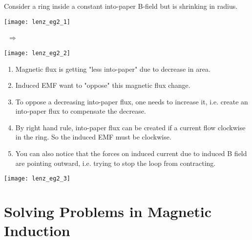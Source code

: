 \documentclass[class=article, crop=false, 12pt]{standalone}
\begin{document}
\begin{example}
    Consider a ring inside a constant into-paper B-field
    but is shrinking in radius.
    \begin{center}
        \begin{minipage}{0.3\linewidth}
            \centering
            \texttt{[image: lenz\_eg2\_1]}
            \phantom{A}
        \end{minipage}
        {\huge \ $\Rightarrow$\ }
        \begin{minipage}{0.3\linewidth}
            \centering
            \texttt{[image: lenz\_eg2\_2]}
        \end{minipage}
    \end{center}

    \begin{enumerate}
        \item Magnetic flux is getting "less into-paper" due to
        decrease in area.
        \item Induced EMF want to "oppose" this magnetic flux change.
        \item To oppose a decreasing into-paper flux, one needs to increase it,
        i.e. create an into-paper flux to compensate the decrease.
        \item By right hand rule, into-paper flux can be created
        if a current flow clockwise in the ring.
        So the induced EMF must be clockwise.
        \item You can also notice that the forces on induced current 
        due to induced B field are pointing outward, 
        i.e. trying to stop the loop from contracting.
        
    \end{enumerate}

    \begin{center}
        \begin{minipage}{0.65\linewidth}
            \centering
            \texttt{[image: lenz\_eg2\_3]}
        \end{minipage}
    \end{center}

\end{example}



\linesep
\section{Solving Problems in Magnetic Induction}
\end{document}
